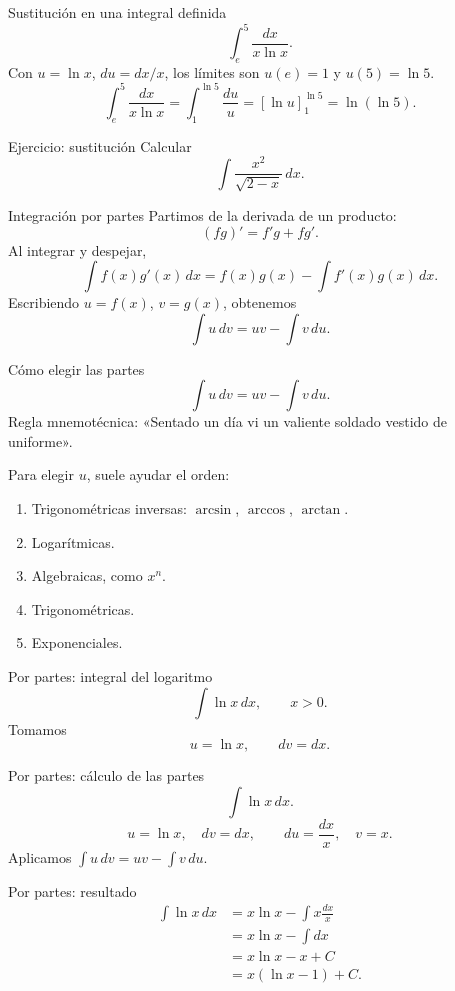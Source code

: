 \documentclass[original_version/main.tex]{subfiles}
\begin{document}
\begin{frame}{Sustitución en una integral definida}
\[\int_e^5\frac{dx}{x\ln x}.\]Con $u=\ln x$, $du=dx/x$, los límites son $u(e)=1$ y $u(5)=\ln5$.\[\int_e^5\frac{dx}{x\ln x}=\int_1^{\ln5}\frac{du}{u}=[\ln u]_1^{\ln5}=\boxed{\ln(\ln5)}.\]
\end{frame}

\begin{frame}{Ejercicio: sustitución}
Calcular\[\int\frac{x^2}{\sqrt{2-x}}\,dx.\]
\end{frame}

\begin{frame}{Integración por partes}
\small Partimos de la derivada de un producto:\[(fg)\prime=f\prime g+fg\prime.\]Al integrar y despejar,\[\int f(x)g\prime(x)\,dx=f(x)g(x)-\int f\prime(x)g(x)\,dx.\]Escribiendo $u=f(x)$, $v=g(x)$, obtenemos\[\boxed{\int u\,dv=uv-\int v\,du.}\]
\end{frame}

\begin{frame}{Cómo elegir las partes}
\[\int u\,dv=uv-\int v\,du.\]Regla mnemotécnica: «Sentado un día vi un valiente soldado vestido de uniforme».\par\medskip Para elegir $u$, suele ayudar el orden:\begin{enumerate}\item Trigonométricas inversas: $\arcsin$, $\arccos$, $\arctan$.\item Logarítmicas.\item Algebraicas, como $x^n$.\item Trigonométricas.\item Exponenciales.\end{enumerate}
\end{frame}

\begin{frame}{Por partes: integral del logaritmo}
\[\int\ln x\,dx,\qquad x>0.\]Tomamos\[u=\ln x,\qquad dv=dx.\]
\end{frame}

\begin{frame}{Por partes: cálculo de las partes}
\[\int\ln x\,dx.\]\[u=\ln x,\quad dv=dx,\qquad du=\frac{dx}{x},\quad v=x.\]Aplicamos $\int u\,dv=uv-\int v\,du$.
\end{frame}

\begin{frame}{Por partes: resultado}
\begin{align*}\int\ln x\,dx&=x\ln x-\int x\frac{dx}{x}\\&=x\ln x-\int dx\\&=x\ln x-x+C\\&=\boxed{x(\ln x-1)+C.}\end{align*}
\end{frame}
\end{document}
